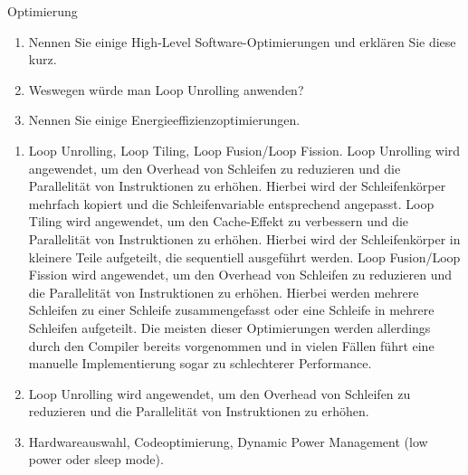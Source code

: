 \documentclass{article}
\begin{document}
\begin{exercise}{Optimierung}
  \begin{enumerate}
    \item Nennen Sie einige High-Level Software-Optimierungen und erklären Sie diese kurz.
    \item Weswegen würde man Loop Unrolling anwenden?
    \item Nennen Sie einige Energieeffizienzoptimierungen.
  \end{enumerate}

  \begin{solution}
    \begin{enumerate}
      \item Loop Unrolling, Loop Tiling, Loop Fusion/Loop Fission.
            Loop Unrolling wird angewendet, um den Overhead von Schleifen zu reduzieren und die Parallelität von Instruktionen zu erhöhen. Hierbei wird der Schleifenkörper mehrfach kopiert und die Schleifenvariable entsprechend angepasst.
            Loop Tiling wird angewendet, um den Cache-Effekt zu verbessern und die Parallelität von Instruktionen zu erhöhen. Hierbei wird der Schleifenkörper in kleinere Teile aufgeteilt, die sequentiell ausgeführt werden.
            Loop Fusion/Loop Fission wird angewendet, um den Overhead von Schleifen zu reduzieren und die Parallelität von Instruktionen zu erhöhen. Hierbei werden mehrere Schleifen zu einer Schleife zusammengefasst oder eine Schleife in mehrere Schleifen aufgeteilt.
            Die meisten dieser Optimierungen werden allerdings durch den Compiler bereits vorgenommen und in vielen Fällen führt eine manuelle Implementierung sogar zu schlechterer Performance.
      \item Loop Unrolling wird angewendet, um den Overhead von Schleifen zu reduzieren und die Parallelität von Instruktionen zu erhöhen.
      \item Hardwareauswahl, Codeoptimierung, Dynamic Power Management (low power oder sleep mode).
    \end{enumerate}
  \end{solution}
\end{exercise}
\end{document}
